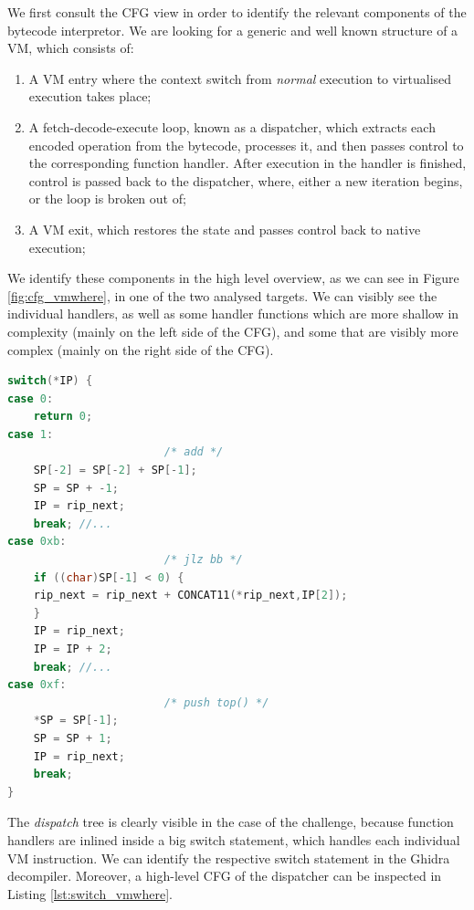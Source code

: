 We first consult the \gls{CFG} view in order to identify the relevant components of the bytecode interpretor. We are looking for a generic and well known structure of a \gls{VM}, which consists of: 
\begin{enumerate}
    \item A \gls{VM} entry where the context switch from \emph{normal} execution to virtualised execution takes place;
    \item A fetch-decode-execute loop, known as a dispatcher, which extracts each encoded operation from the bytecode, processes it, and then passes control to the corresponding function handler. After execution in the handler is finished, control is passed back to the dispatcher, where, either a new iteration begins, or the loop is broken out of;
    \item A \gls{VM} exit, which restores the state and passes control back to native execution;
\end{enumerate}

   We identify these components in the high level overview, as we can see in Figure \ref{fig:cfg_vmwhere}, in one of the two analysed targets. We can visibly see the individual handlers, as well as some handler functions which are more shallow in complexity (mainly on the left side of the \gls{CFG}), and some that are visibly more complex (mainly on the right side of the \gls{CFG}). 

\begin{lstlisting}[language=c, label={lst:switch_vmwhere}, caption={Decompilation section of the \cc{vmwhere} dispatcher, after variable renaming and retyping. We notice the implementation of the \cc{add}, \cc{jlz} and \cc{push_top} instructions.}]
switch(*IP) {
case 0:
    return 0;
case 1:
                        /* add */
    SP[-2] = SP[-2] + SP[-1];
    SP = SP + -1;
    IP = rip_next;
    break; //...
case 0xb:
                        /* jlz bb */
    if ((char)SP[-1] < 0) {
    rip_next = rip_next + CONCAT11(*rip_next,IP[2]);
    }
    IP = rip_next;
    IP = IP + 2;
    break; //...
case 0xf:
                        /* push top() */
    *SP = SP[-1];
    SP = SP + 1;
    IP = rip_next;
    break;
}
\end{lstlisting}

The \emph{dispatch} tree is clearly visible in the case of the  challenge, because function handlers are inlined inside a big switch statement, which handles each individual \gls{VM} instruction. We can identify the respective switch statement in the Ghidra decompiler. Moreover, a high-level \gls{CFG} of the dispatcher can be inspected in Listing \ref{lst:switch_vmwhere}. 

